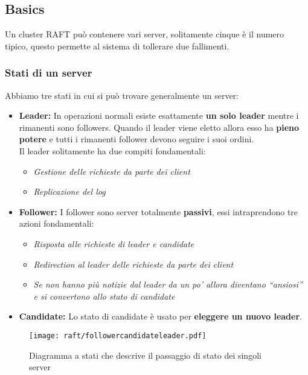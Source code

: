 \subsection{Basics}
Un cluster RAFT può contenere vari server, solitamente cinque è il numero tipico, questo permette al sistema di tollerare due fallimenti.
  \subsubsection{Stati di un server}
  Abbiamo tre stati in cui si può trovare generalmente un server:
  \begin{itemize}
    \item{\textbf{Leader:}}
    In operazioni normali esiste esattamente \textbf{un solo leader} mentre i rimanenti sono followers. Quando il leader viene eletto allora esso ha \textbf{pieno potere} e tutti i rimanenti follower devono seguire i suoi ordini.\\
    Il leader solitamente ha due compiti fondamentali:
    \begin{itemize}
      \item{\emph{Gestione delle richieste da parte dei client}} 
      \item{\emph{Replicazione del log}}
    \end{itemize}
    \item{\textbf{Follower:}}
    I follower sono server totalmente \textbf{passivi}, essi intraprendono tre azioni fondamentali: 
    \begin{itemize}
      \item{\emph{Risposta alle richieste di leader e candidate}}
      \item{\emph{Redirection al leader delle richieste da parte dei client}}
      \item{\emph{Se non hanno più notizie dal leader da un po' allora diventano ``ansiosi'' e si convertono allo stato di candidate}}
    \end{itemize}
    \item{\textbf{Candidate:}}
    Lo stato di candidate è usato per \textbf{eleggere un nuovo leader}.
  \end{itemize}

  \begin{figure}[H]
    \centering
    \texttt{[image: raft/followercandidateleader.pdf]}
    \caption{Diagramma a stati che descrive il passaggio di stato dei singoli server}
    \label{fig:figure2}
  \end{figure}

